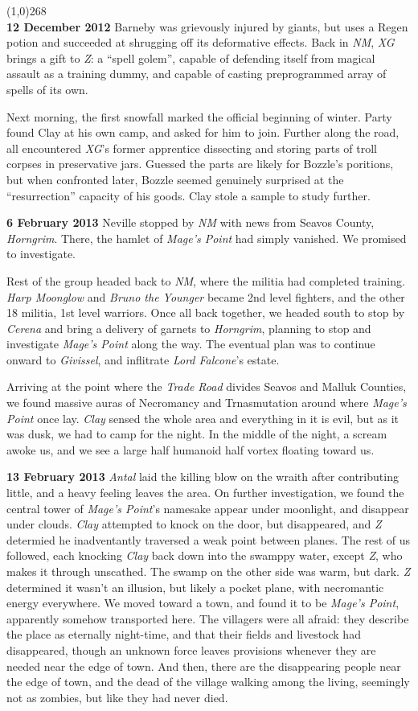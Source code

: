 \documentclass[letterpaper]{article}
\newcommand{\colline}{\noindent\line(1,0){268} \\}
\newcommand{\e}[1]{\emph{#1}}
\newcommand{\B}[1]{\textbf{#1}}
\newenvironment{notesection}[1]
{\noindent {\huge \B{#1}} \par
\vspace{-0.75em}
\colline
\begingroup\fontsize{9pt}{12pt}\selectfont}
{\endgroup}
\begin{document}
\begin{notesection}{Events}
\B{12 December 2012} Barneby was grievously injured by giants, but uses a Regen potion and succeeded at shrugging off its deformative effects. Back in \e{NM}, \e{XG} brings a gift to \e{Z}: a ``spell golem'', capable of defending itself from magical assault as a training dummy, and capable of casting preprogrammed array of spells of its own.

Next morning, the first snowfall marked the official beginning of winter.  Party found Clay at his own camp, and asked for him to join.  Further along the road, all encountered \e{XG}'s former apprentice dissecting and storing parts of troll corpses in preservative jars.  Guessed the parts are likely for Bozzle's poritions, but when confronted later, Bozzle seemed genuinely surprised at the ``resurrection'' capacity of his goods.  Clay stole a sample to study further.

\B{6 February 2013} Neville stopped by \e{NM} with news from Seavos County, \e{Horngrim}.  There, the hamlet of \e{Mage's Point} had simply vanished.  We promised to investigate.

Rest of the group headed back to \e{NM}, where the militia had completed training. \e{Harp Moonglow} and \e{Bruno the Younger} became 2nd level fighters, and the other 18 militia, 1st level warriors. Once all back together, we headed south to stop by \e{Cerena} and bring a delivery of garnets to \e{Horngrim}, planning to stop and investigate \e{Mage's Point} along the way.  The eventual plan was to continue onward to \e{Givissel}, and inflitrate \e{Lord Falcone}'s estate.

Arriving at the point where the \e{Trade Road} divides Seavos and Malluk Counties, we found massive auras of Necromancy and Trnasmutation around where \e{Mage's Point} once lay. \e{Clay} sensed the whole area and everything in it is evil, but as it was dusk, we had to camp for the night.  In the middle of the night, a scream awoke us, and we see a large half humanoid half vortex floating toward us.

\B{13 February 2013} \e{Antal} laid the killing blow on the wraith after contributing little, and a heavy feeling leaves the area.  On further investigation, we found the central tower of \e{Mage's Point}'s namesake appear under moonlight, and disappear under clouds.  \e{Clay} attempted to knock on the door, but disappeared, and \e{Z} determied he inadventantly traversed a weak point between planes. The rest of us followed, each knocking \e{Clay} back down into the swamppy water, except \e{Z}, who makes it through unscathed. The swamp on the other side was warm, but dark. \e{Z} determined it wasn't an illusion, but likely a pocket plane, with necromantic energy everywhere. We moved toward a town, and found it to be \e{Mage's Point}, apparently somehow transported here.  The villagers were all afraid: they describe the place as eternally night-time, and that their fields and livestock had disappeared, though an unknown force leaves provisions whenever they are needed near the edge of town.  And then, there are the disappearing people near the edge of town, and the dead of the village walking among the living, seemingly not as zombies, but like they had never died.


\end{notesection}
\end{document}
